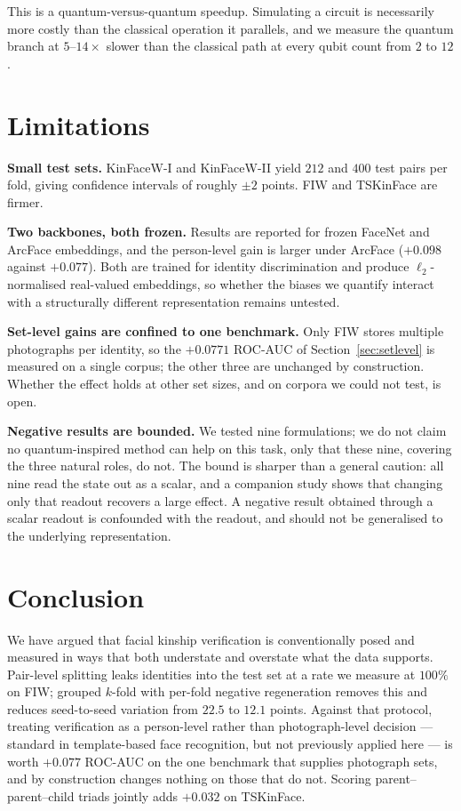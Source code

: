 \documentclass[journal,12pt]{IEEEtran}
\begin{document}
This is a quantum-versus-quantum speedup. Simulating a circuit is necessarily
more costly than the classical operation it parallels, and we measure the
quantum branch at $5$--$14\times$ slower than the classical path at every qubit
count from $2$ to $12$.

\section{Limitations}
\label{sec:limitations}

\textbf{Small test sets.} KinFaceW-I and KinFaceW-II yield $212$ and $400$ test
pairs per fold, giving confidence intervals of roughly $\pm 2$ points. FIW and
TSKinFace are firmer.

\textbf{Two backbones, both frozen.} Results are reported for frozen
FaceNet and ArcFace embeddings, and the person-level gain is larger under
ArcFace ($+0.098$ against $+0.077$). Both are trained for identity
discrimination and produce $\ell_2$-normalised real-valued embeddings, so
whether the biases we quantify interact with a structurally different
representation remains untested.

\textbf{Set-level gains are confined to one benchmark.} Only FIW stores
multiple photographs per identity, so the $+0.0771$ ROC-AUC of
Section~\ref{sec:setlevel} is measured on a single corpus; the other three are
unchanged by construction. Whether the effect holds at other set sizes, and on
corpora we could not test, is open.

\textbf{Negative results are bounded.} We tested nine formulations; we do not
claim no quantum-inspired method can help on this task, only that these nine,
covering the three natural roles, do not. The bound is sharper than a general
caution: all nine read the state out as a scalar, and a companion study shows
that changing only that readout recovers a large effect. A negative result
obtained through a scalar readout is confounded with the readout, and should
not be generalised to the underlying representation.

\section{Conclusion}

We have argued that facial kinship verification is conventionally posed and
measured in ways that both understate and overstate what the data supports.
Pair-level splitting leaks identities into the test set at a rate we measure at
$100\%$ on FIW; grouped $k$-fold with per-fold negative regeneration removes
this and reduces seed-to-seed variation from $22.5$ to $12.1$ points. Against
that protocol, treating verification as a person-level rather than
photograph-level decision --- standard in template-based face recognition, but
not previously applied here --- is worth $+0.077$ ROC-AUC on the one benchmark
that supplies photograph sets, and by construction changes nothing on those
that do not. Scoring parent--parent--child triads jointly adds $+0.032$ on
TSKinFace.
\end{document}
